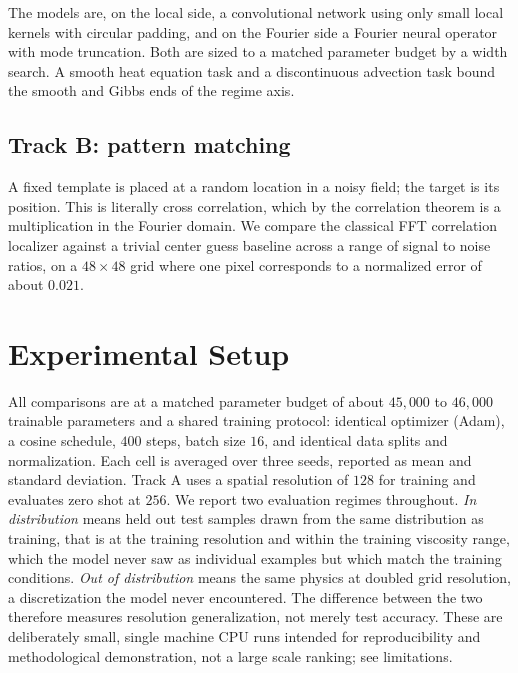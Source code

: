 \documentclass[conference]{IEEEtran}
\begin{document}
The models are, on the local side, a convolutional network using only small local kernels with circular padding, and on the Fourier side a Fourier neural operator with mode truncation. Both are sized to a matched parameter budget by a width search. A smooth heat equation task and a discontinuous advection task bound the smooth and Gibbs ends of the regime axis.

\subsection{Track B: pattern matching}
A fixed template is placed at a random location in a noisy field; the target is its position. This is literally cross correlation, which by the correlation theorem is a multiplication in the Fourier domain. We compare the classical FFT correlation localizer against a trivial center guess baseline across a range of signal to noise ratios, on a $48 \times 48$ grid where one pixel corresponds to a normalized error of about $0.021$.

\section{Experimental Setup}
All comparisons are at a matched parameter budget of about $45{,}000$ to $46{,}000$ trainable parameters and a shared training protocol: identical optimizer (Adam), a cosine schedule, $400$ steps, batch size $16$, and identical data splits and normalization. Each cell is averaged over three seeds, reported as mean and standard deviation. Track A uses a spatial resolution of $128$ for training and evaluates zero shot at $256$. We report two evaluation regimes throughout. \emph{In distribution} means held out test samples drawn from the same distribution as training, that is at the training resolution and within the training viscosity range, which the model never saw as individual examples but which match the training conditions. \emph{Out of distribution} means the same physics at doubled grid resolution, a discretization the model never encountered. The difference between the two therefore measures resolution generalization, not merely test accuracy. These are deliberately small, single machine CPU runs intended for reproducibility and methodological demonstration, not a large scale ranking; see limitations.
\end{document}

